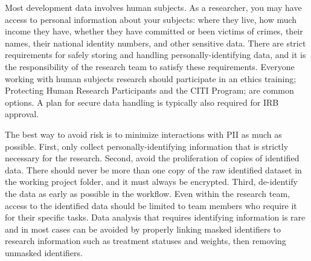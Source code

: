 Most development data involves human subjects.
As a researcher, you may have access to personal information about your subjects:
where they live, how much income they have,
whether they have committed or been victims of crimes,
their names, their national identity numbers, and other sensitive data.
There are strict requirements for safely storing and handling personally-identifying data,
and it is the responsibility of the research team to satisfy these requirements.
Everyone working with human subjects research should participate in an ethics training;
Protecting Human Research Participants
and the CITI Program;
are common options.
A plan for secure data handling is typically also required for IRB approval.

The best way to avoid risk is to minimize interactions with PII as much as possible.
First, only collect personally-identifying information that is strictly necessary for the research.
Second, avoid the proliferation of copies of identified data.
There should never be more than one copy of the raw identified dataset in the working project folder,
and it must always be encrypted.
Third, de-identify the data as early as possible in the workflow.
Even within the research team,
access to the identified data should be limited to team members who require it for their specific tasks.
Data analysis that requires identifying information is rare
and in most cases can be avoided by properly linking masked identifiers to research information
such as treatment statuses and weights, then removing unmasked identifiers.

